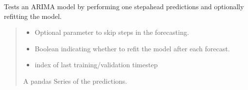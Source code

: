 \documentclass[letterpaper,10pt,english]{sphinxmanual}
\begin{document}
\begin{fulllineitems}
\begin{fulllineitems}
\label{\detokenize{docs/model_testing:model_testing.ModelTest.test_ARIMA_model}}
\pysigstartsignatures
{}
\pysigstopsignatures
\sphinxAtStartPar
Tests an ARIMA model by performing one step\sphinxhyphen{}ahead predictions and optionally refitting the model.
\begin{quote}\begin{description}
\begin{itemize}
\item {} 
\sphinxAtStartPar
{} \textendash{} Optional parameter to skip steps in the forecasting.

\item {} 
\sphinxAtStartPar
{} \textendash{} Boolean indicating whether to refit the model after each forecast.

\item {} 
\sphinxAtStartPar
{} \textendash{} index of last training/validation timestep

\end{itemize}

\sphinxAtStartPar
A pandas Series of the predictions.

\end{description}\end{quote}

\end{fulllineitems}



\end{fulllineitems}
\end{document}
